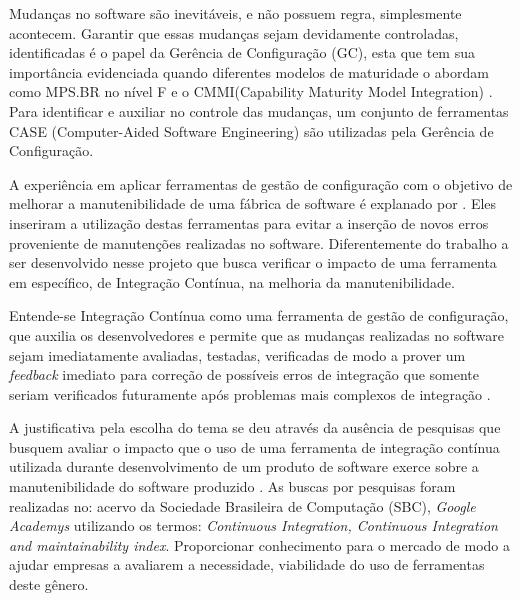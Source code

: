 Mudanças no software são inevitáveis, e não possuem regra, simplesmente acontecem. Garantir que essas mudanças sejam devidamente controladas, identificadas é o papel da  Gerência de Configuração (GC), esta que tem sua importância evidenciada quando diferentes modelos de maturidade o abordam como MPS.BR no nível F e o CMMI(Capability Maturity Model Integration) \cite{furlaneto2006}. Para identificar e auxiliar no controle das mudanças, um conjunto de ferramentas CASE (Computer-Aided Software Engineering) são utilizadas pela Gerência de Configuração.

A experiência em aplicar ferramentas  de gestão de configuração com o objetivo de melhorar a manutenibilidade de uma fábrica de software é explanado por . Eles inseriram a utilização destas ferramentas para evitar a inserção de novos erros proveniente de manutenções realizadas no software. Diferentemente do trabalho a ser desenvolvido nesse projeto que busca verificar o impacto de uma ferramenta em específico, de Integração Contínua,  na melhoria da manutenibilidade.

Entende-se Integração Contínua como uma ferramenta de gestão de configuração, que auxilia os desenvolvedores e permite que as mudanças realizadas no software sejam imediatamente avaliadas, testadas, verificadas de modo a prover um  \textit{feedback} imediato para correção de possíveis erros de integração que somente seriam verificados futuramente após problemas mais complexos de integração \cite{paul2007}.

A justificativa pela escolha do tema se deu através da ausência de pesquisas que busquem avaliar o impacto que o uso de uma ferramenta de integração contínua utilizada durante desenvolvimento de um produto de software exerce sobre a manutenibilidade do software produzido \cite{rodrigo2007}. As buscas por pesquisas foram realizadas no: acervo da Sociedade Brasileira de Computação (SBC), \textit{Google Academys} utilizando os termos: \textit{Continuous Integration, Continuous Integration and maintainability index}. Proporcionar conhecimento para o mercado de modo a ajudar empresas a avaliarem a necessidade, viabilidade do uso de ferramentas deste gênero.